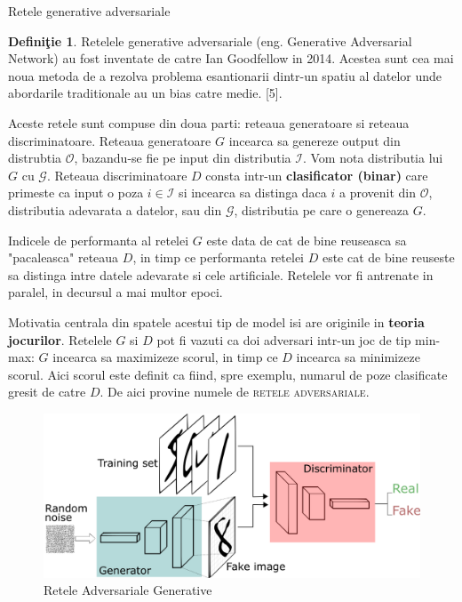 \documentclass[12pt]{article}
\theoremstyle{definition}
\newtheorem{defi}[thr]{\bf Defini\c{t}ie}
\begin{document}
\begin{subsubsection}{Retele generative adversariale}
\begin{defi}
Retelele generative adversariale (eng. Generative Adversarial Network) au fost inventate de catre Ian Goodfellow in 2014.
Acestea sunt cea mai noua metoda de a rezolva problema esantionarii dintr-un spatiu al datelor unde abordarile traditionale au un bias catre medie. [5].

Aceste retele sunt compuse din doua parti: reteaua generatoare si reteaua discriminatoare.
Reteaua generatoare $G$ incearca sa genereze output din distrubtia $\mathcal{O}$, bazandu-se fie pe input din distributia $\mathcal{I}$. Vom nota distributia lui $G$ cu $\mathcal{G}$.
Reteaua discriminatoare $D$ consta intr-un \textbf{clasificator (binar)} care primeste ca input o poza $i \in \mathcal{I}$ si incearca sa distinga daca $i$ a provenit din $\mathcal{O}$, distributia adevarata a datelor, sau din $\mathcal{G}$, distributia pe care o genereaza $G$.

Indicele de performanta al retelei $G$ este data de cat de bine reuseasca sa "pacaleasca" reteaua $D$, in timp ce performanta retelei $D$ este cat de bine reuseste sa distinga intre datele adevarate si cele artificiale. Retelele vor fi antrenate in paralel, in decursul a mai multor epoci.

\end{defi}
Motivatia centrala din spatele acestui tip de model isi are originile in \textbf{teoria jocurilor}. Retelele $G$ si $D$ pot fi vazuti ca doi adversari intr-un joc de tip min-max: $G$ incearca sa maximizeze scorul, in timp ce $D$ incearca sa minimizeze scorul. Aici scorul este definit ca fiind, spre exemplu, numarul de poze clasificate gresit de catre $D$. De aici provine numele de \textsc{retele adversariale}.

\begin{figure}
  \centering
  \includegraphics[width=0.7\linewidth]{GAN.png}
  \caption{Retele Adversariale Generative}
  \label{fig:GAN}
\end{figure}

\end{subsubsection}
\end{document}
